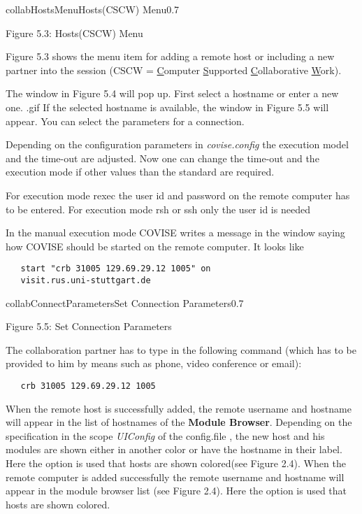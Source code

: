 \begin{covimg}{collab}{HostsMenu}{Hosts(CSCW) Menu}{0.7}\end{covimg}
\begin{htmlonly}
Figure 5.3: Hosts(CSCW) Menu
\vspace{0.5cm}
\end{htmlonly}

Figure 5.3 shows the menu item for adding a remote host or including a new partner 
into the session (CSCW = \underline{C}omputer \underline{S}upported \underline{C}ollaborative 
\underline{W}ork).

The window in Figure 5.4 will pop up. First select a hostname or enter a new one. 
.gif
If the selected hostname is available, the window in Figure 5.5 will appear. You 
can select the parameters for a connection.

Depending on the configuration parameters in {\it covise.config} the execution model 
and the time-out are adjusted. Now one can change the time-out and the execution mode 
if other values than the standard are required. 

For execution mode rexec the user id and password on the remote computer has to
be entered. For execution mode rsh or ssh only the user id is needed


In the manual execution mode COVISE writes a message in the window saying how COVISE 
should be started on the remote computer. It looks like 

\begin{verbatim}
   start "crb 31005 129.69.29.12 1005" on 
   visit.rus.uni-stuttgart.de
\end{verbatim}


\begin{covimg}{collab}{ConnectParameters}{Set Connection Parameters}{0.7}\end{covimg}
\begin{htmlonly}
Figure 5.5: Set Connection Parameters
\vspace{0.5cm}
\end{htmlonly}

The collaboration partner has to type in the following command (which has to be 
provided to him by means such as phone, video conference or email):
\begin{verbatim}
   crb 31005 129.69.29.12 1005
\end{verbatim}

When the remote  host is successfully added, the remote username and hostname will appear 
in the list of hostnames of the {\bf Module Browser}.  Depending on the specification 
in the scope {\it UIConfig} of the  config.file , the new host 
and his modules are shown either in another color or have the hostname in their label. 
Here the option is used that hosts are shown colored(see Figure 2.4).                                      
When the remote computer is added successfully the remote username and hostname will 
appear in the module browser list (see Figure 2.4). Here the option is used that hosts 
are shown colored.

